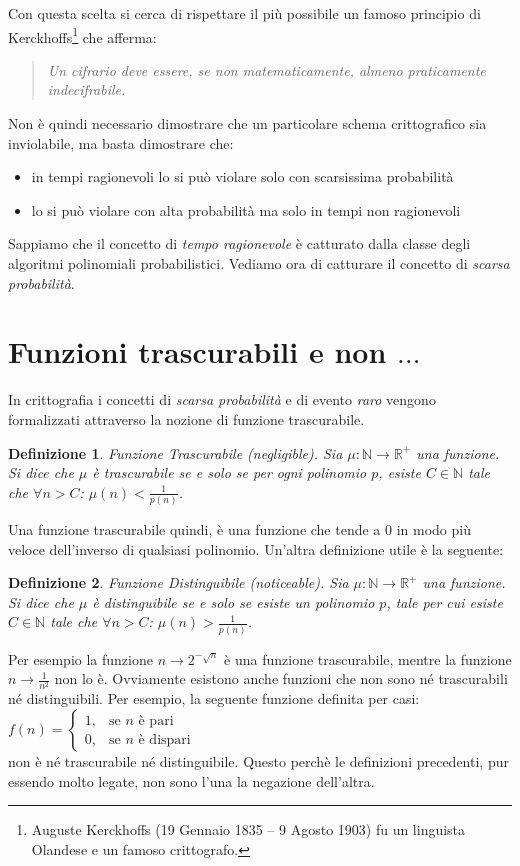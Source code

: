 \documentclass[a4paper,openright,twoside,12pt]{report}
\newtheorem{definizione}{Definizione}[chapter]
\begin{document}
Con questa scelta si cerca di rispettare il pi\`u possibile un famoso principio di Kerckhoffs\footnote{Auguste Kerckhoffs (19 Gennaio 1835 – 9 Agosto 1903) 
fu un linguista Olandese e un famoso crittografo.} che afferma: 
\begin{quotation}
\em
Un cifrario deve essere, se non matematicamente, almeno praticamente indecifrabile.
\end{quotation}
\newpage
Non \`e quindi necessario dimostrare che un particolare schema crittografico sia inviolabile, ma basta dimostrare che:
\begin{itemize}
 \item in tempi ragionevoli lo si pu\`o violare solo con scarsissima probabilit\`a
 \item lo si pu\`o violare con alta probabilit\`a ma solo in tempi non ragionevoli
\end{itemize}
Sappiamo che il concetto di \emph{tempo ragionevole} \`e catturato dalla classe degli algoritmi polinomiali probabilistici. Vediamo ora di catturare il concetto di \emph{scarsa probabilit\`a}.
\section{Funzioni trascurabili e non $\dots$}
In crittografia i concetti di \emph{scarsa probabilit\`a} e di evento \emph{raro} vengono formalizzati attraverso la nozione di funzione trascurabile.
\begin{definizione}{Funzione Trascurabile (negligible).}
Sia $\mu: \mathbb{N} \rightarrow \mathbb{R^{+}}$ una funzione. Si dice che $\mu$ \`e trascurabile se e solo se per ogni polinomio $p$, esiste $C \in \mathbb{N} $ tale che $\forall n>C$: $\mu(n) < \frac{1}{p(n)}$.  
\end{definizione}
Una funzione trascurabile quindi, \`e una funzione che tende a 0 in modo pi\`u veloce dell'inverso di qualsiasi polinomio.
Un'altra definizione utile \`e la seguente:
\begin{definizione}{Funzione Distinguibile (noticeable).}
Sia $\mu: \mathbb{N} \rightarrow \mathbb{R^{+}}$ una funzione. Si dice che $\mu$ \`e distinguibile se e solo se esiste un polinomio $p$, tale per cui esiste $C \in \mathbb{N} $ tale che $\forall n>C$: $\mu(n) > \frac{1}{p(n)}$.  
\end{definizione}
Per esempio la funzione $n \rightarrow 2^{-\sqrt{n}}$ \`e una funzione trascurabile, mentre la funzione $n \rightarrow \frac{1}{n^2}$ non lo \`e. 
Ovviamente esistono anche funzioni che non sono n\'e trascurabili n\'e distinguibili. Per esempio, la seguente funzione definita per casi:
$f(n) = \begin{cases} 1, & \mbox{se } n\mbox{ \`e pari} \\ 0, & \mbox{se } n\mbox{ \`e dispari} \end{cases}$\\
non \`e n\'e trascurabile n\'e distinguibile. Questo perch\`e le definizioni precedenti, pur essendo molto legate, non sono l'una la negazione dell'altra.
\end{document}
